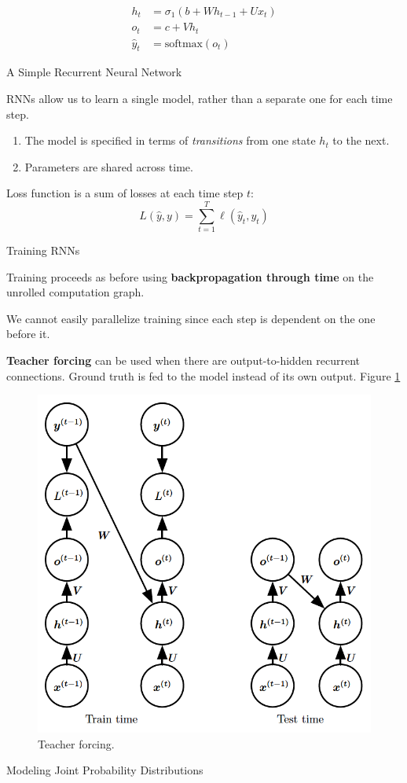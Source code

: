 \documentclass[english]{article}
\begin{document}
\begin{align*}
h_t &= \sigma_1(b+Wh_{t-1}+Ux_t)\\
o_t &= c+Vh_t\\
\hat{y}_t &= \text{softmax}(o_t)
\end{align*}
 

\item 
 {A Simple Recurrent Neural Network}

RNNs allow us to learn a single model, rather than a separate one for each time step.
\begin{enumerate}
\item The model is specified in terms of \textit{transitions} from one state $h_t$ to the next.
\item Parameters are shared across time.
 
\end{enumerate}
Loss function is a sum of losses at each time step $t$:
$$L(\hat{y},y)=\sum_{t=1}^T \ell(\hat{y}_t, y_t)$$
 

\item 
 {Training RNNs}

Training proceeds as before using \textbf{backpropagation through time} on the unrolled computation graph.
 
We cannot easily parallelize training since each step is dependent on the one before it.
 
\textbf{Teacher forcing} can be used when there are output-to-hidden recurrent connections. Ground truth is fed to the model instead of its own output.  Figure \ref{Teacher forcing}
\begin{figure}
\centering
\includegraphics[height=0.5\linewidth]{teacher-forcing.png}
    \caption{Teacher forcing.}
    \label{Teacher forcing}
\end{figure}
 

\item 
 {Modeling Joint Probability Distributions}
\end{document}
